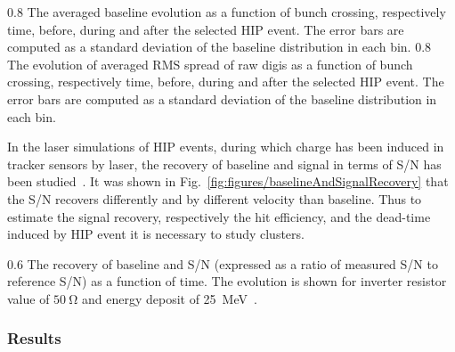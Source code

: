                  {0.8}       %
                 {The averaged baseline evolution as a function of bunch crossing, respectively time, before, during and after the selected HIP event. The error bars are computed as a standard deviation of the baseline distribution in each bin.  } %
                 {0.8}       %
                 {The evolution of averaged RMS spread of raw digis as a function of bunch crossing, respectively time, before, during and after the selected HIP event. The error bars are computed as a standard deviation of the baseline distribution in each bin.  } %


In the laser simulations of HIP events, during which charge has been induced in tracker sensors by laser, the recovery of baseline and signal in terms of S/N has been studied~\cite{Adam:2005pz}. It was shown in Fig.~\ref{fig:figures/baselineAndSignalRecovery} that the S/N recovers differently and by different velocity than baseline. Thus to estimate the signal recovery, respectively the hit efficiency, and the dead-time induced by HIP event it is necessary to study clusters.

                 {0.6}       %
                 {The recovery of baseline and S/N (expressed as a ratio of measured S/N to reference S/N) as a function of time. The evolution is shown for inverter resistor value of $50~\mathrm{\Omega}$ and energy deposit of 25~MeV~\cite{Adam:2005pz}.} %

\subsubsection{Results}

